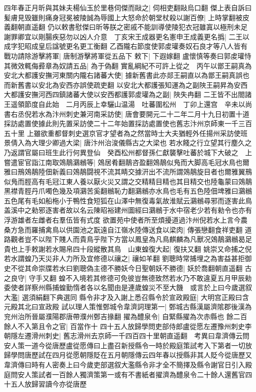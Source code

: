 四年春正月昕與其妹夫楊仙玉於里巷伺傑而敺之|{
	伺相吏翻敺烏口翻}
傑上表自訴曰髪膚見毁雖則痛身冠冕被陵誠為辱國上大怒命於朝堂杖殺以謝百僚|{
	上時掌翻被皮義翻朝直遥翻}
仍以敕書慰傑曰昕等朕之密戚不能訓導使陵犯衣冠雖寘以極刑未足謝罪卿宜以剛腸疾惡勿以凶人介意　丁亥宋王成器更名憲申王成義更名撝|{
	二王以成字犯昭成皇后諡號更名更工衡翻}
乙酉隴右節度使郭䖍瓘奏奴石良才等八人皆有戰功請除游擊將軍|{
	唐制游擊將軍從五品下}
敕下|{
	下遐嫁翻}
盧懷慎等奏曰郭䖍瓘恃其微效輒侮彛章為奴請五品|{
	為于偽翻}
實亂綱紀不可許上從之　丙午以鄫王嗣真為安北大都護安撫河東關内隴右諸蕃大使|{
	據新舊書此亦郯王嗣直以為鄫王嗣真誤也而新舊書以安北為安西亦誤使疏吏翻}
以安北大都護張知運為之副陜王嗣昇為安西大都護安撫河西四鎮諸蕃大使以安西都護郭䖍瓘為之副|{
	陜失冉翻}
二王皆不出閤諸王遥領節度自此始　二月丙辰上幸驪山温湯　吐蕃圍松州　丁卯上還宫　辛未以尚書右丞倪若水為汴州刺史兼河南采訪使|{
	唐會要開元二十二年二月十九日初置十道採訪處置使據此則先置采訪使二十二年始置採訪處置使也舊志汴州京師東一千三百五十里}
上雖欲重都督刺史選京官才望者為之然當時士大夫猶輕外任揚州采訪使班景倩入為大理少卿過大梁|{
	唐汴州治浚儀縣古之大梁也}
若水餞之行立望其行塵久之乃返謂官屬曰班生此行何異登仙　癸酉松州都督孫仁獻襲擊吐蕃於城下大破之　上嘗遣宦官詣江南取鵁鶄鸂䳵等|{
	鵁居肴翻鶄咨盈翻鵁鶄似鳬而大脚高毛冠水鳥也爾雅曰鳽鵁鶄陸佃新義曰鵁鶄闘視不流其睛交據汧出不流所謂鵁鶄旋目者也爾雅翼鳽似鳬而脛高有毛冠江東人養以厭火災又謂之交精精目精也其目精交也陸龜蒙曰鵁鶄黑襟青脛丹爪噣色幾及項鸂苦奚翻䳵恥力翻鸂䳵亦水鳥也毛有五色陸佃埤雅曰鸂䳵五色尾有毛如船柂小于鴨性食短狐在山澤中無復毒氣故淮賦云鸂䳵尋邪而逐害此鳥盖溪中之勑邪逐害者故以名云陳昭裕建州圖經曰鸂䳵于水中宿老少若有勑令也亦有浮游雄者左雌者右羣伍皆有式度}
欲置苑中使者所至煩擾道過汴州倪若水上言今農桑方急而羅捕禽鳥以供園池之翫遠自江嶺水陸傳送食以梁肉|{
	傳張戀翻食祥吏翻}
道路觀者豈不以陛下賤人而貴鳥乎陛下方當以鳳皇為凡鳥麒麟為凡獸况鵁鶄鸂䳵曷足貴也上手敕謝若水賜帛四十段縱散其鳥　山東蝗復大起|{
	復扶又翻}
姚崇又命捕之倪若水謂蝗乃天災非人力所及宜修德以禳之|{
	禳如羊翻}
劉聰時常捕埋之為害益甚拒御史不從其命崇牒若水曰劉聰偽主德不勝妖今日聖朝妖不勝德|{
	妖於喬翻朝直遥翻}
古之良守|{
	守手又翻}
蝗不入境若其修德可免彼豈無德致然若水乃不敢違夏五月甲辰勑委使者詳察州縣捕蝗勤惰者各以名聞由是連歲蝗災不至大饑　或言於上曰今歲選叙大濫|{
	選須絹翻下典選同}
縣令非才及入謝上悉召縣令於宣政殿庭|{
	大明宫正殿曰含元殿其北曰宣政殿}
試以理人策惟鄄城令韋濟詞理第一|{
	鄄城古縣漢屬濟隂郡後漢為兖州治所晉屬濮陽郡唐帶濮州鄄吉掾翻}
擢為醴泉令|{
	自緊縣擢為次赤縣也}
餘二百餘人不入第且令之官|{
	百當作十}
四十五人放歸學問吏部侍郎盧從愿左遷豫州刺史李朝隱左遷滑州刺史|{
	舊志滑州去京師一千四百四十里朝直遥翻　考異曰韋濟傳云問安人策一道今從唐歷盧從愿傳曰上盡召新授縣令一時於殿庭策試考入下第者一切放歸學問唐歷試在四月從愿朝隱貶在五月朝隱傳云四年春以授縣非其人貶今從唐歷又韋濟傳曰時有人密奏上曰今歲吏部選叙大濫縣令非才全不簡擇及縣令謝官日引入殿庭問安人策試者一百餘人獨濟策第一或有不書紙者擢濟為醴泉令二十餘人還舊官四十五人放歸習讀今亦從唐歷}

